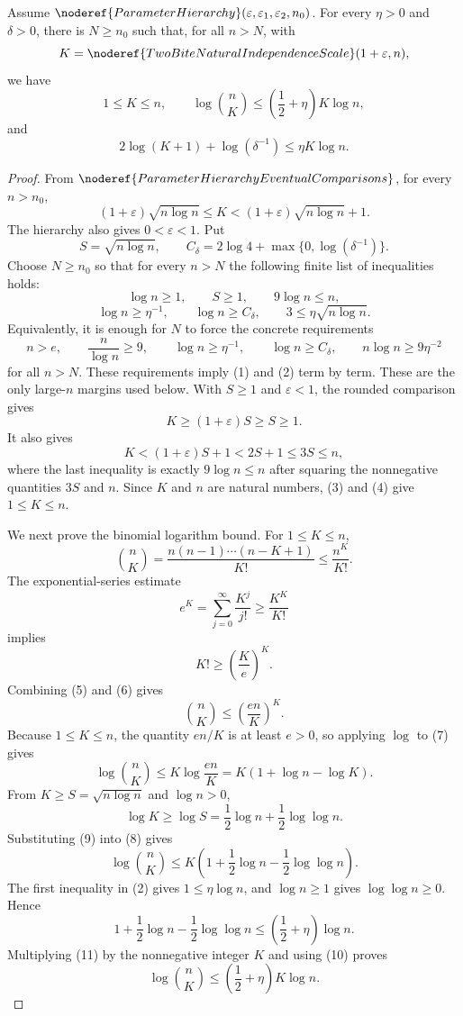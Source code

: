 \begin{lemma}
Assume \(\noderef{ParameterHierarchy}(\varepsilon,\varepsilon_1,\varepsilon_2,n_0)\).
For every \(\eta>0\) and \(\delta>0\), there is \(N\ge n_0\) such that, for
all \(n>N\), with
\[
K=\noderef{TwoBiteNaturalIndependenceScale}(1+\varepsilon,n),
\]
we have
\[
1\le K\le n,
\qquad
\log\binom nK\le \left(\frac12+\eta\right)K\log n,
\]
and
\[
2\log(K+1)+\log(\delta^{-1})\le \eta K\log n.
\]
\end{lemma}
\begin{proof}
From \(\noderef{ParameterHierarchyEventualComparisons}\), for every
\(n>n_0\),
\[
(1+\varepsilon)\sqrt{n\log n}\le K
<(1+\varepsilon)\sqrt{n\log n}+1.
\]
The hierarchy also gives \(0<\varepsilon<1\).  Put
\[
S=\sqrt{n\log n},\qquad
C_\delta=2\log 4+\max\{0,\log(\delta^{-1})\}.
\]
Choose \(N\ge n_0\) so that for every \(n>N\) the following finite list of
inequalities holds:
\[
\log n\ge 1,\qquad S\ge1,\qquad 9\log n\le n, \tag{1}
\]
\[
\log n\ge \eta^{-1},\qquad \log n\ge C_\delta,\qquad
3\le \eta\sqrt{n\log n}. \tag{2}
\]
Equivalently, it is enough for \(N\) to force the concrete requirements
\[
n>e,\qquad \frac{n}{\log n}\ge9,\qquad
\log n\ge\eta^{-1},\qquad \log n\ge C_\delta,\qquad
n\log n\ge 9\eta^{-2}
\]
for all \(n>N\).  These requirements imply (1) and (2) term by term.
These are the only large-\(n\) margins used below.  With \(S\ge1\) and
\(\varepsilon<1\), the rounded comparison gives
\[
K\ge (1+\varepsilon)S\ge S\ge1. \tag{3}
\]
It also gives
\[
K<(1+\varepsilon)S+1<2S+1\le3S\le n, \tag{4}
\]
where the last inequality is exactly \(9\log n\le n\) after squaring the
nonnegative quantities \(3S\) and \(n\).  Since \(K\) and \(n\) are natural
numbers, (3) and (4) give \(1\le K\le n\).

We next prove the binomial logarithm bound.  For \(1\le K\le n\),
\[
\binom nK
=\frac{n(n-1)\cdots(n-K+1)}{K!}
\le \frac{n^K}{K!}. \tag{5}
\]
The exponential-series estimate
\[
e^K=\sum_{j=0}^{\infty}\frac{K^j}{j!}
\ge \frac{K^K}{K!}
\]
implies
\[
K!\ge \left(\frac K e\right)^K. \tag{6}
\]
Combining (5) and (6) gives
\[
\binom nK\le \left(\frac{en}{K}\right)^K. \tag{7}
\]
Because \(1\le K\le n\), the quantity \(en/K\) is at least \(e>0\), so applying
\(\log\) to (7) gives
\[
\log\binom nK
\le K\log\frac{en}{K}
=K(1+\log n-\log K). \tag{8}
\]
From \(K\ge S=\sqrt{n\log n}\) and \(\log n>0\),
\[
\log K\ge \log S
=\frac12\log n+\frac12\log\log n. \tag{9}
\]
Substituting (9) into (8) gives
\[
\log\binom nK
\le K\left(1+\frac12\log n-\frac12\log\log n\right). \tag{10}
\]
The first inequality in (2) gives \(1\le\eta\log n\), and
\(\log n\ge1\) gives \(\log\log n\ge0\).  Hence
\[
1+\frac12\log n-\frac12\log\log n
\le \left(\frac12+\eta\right)\log n. \tag{11}
\]
Multiplying (11) by the nonnegative integer \(K\) and using (10) proves
\[
\log\binom nK\le\left(\frac12+\eta\right)K\log n.
\]


\end{proof}
